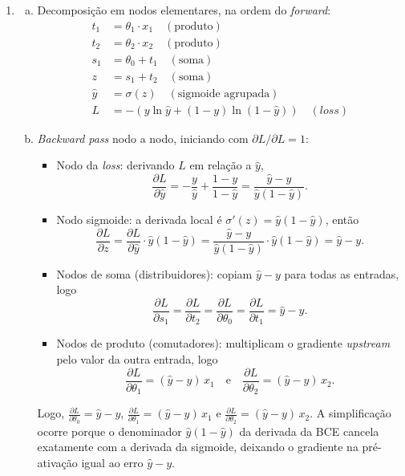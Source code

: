 \documentclass{dlproblemset}
\begin{document}
\begin{enumerate}[1)]
    \item
    \begin{enumerate}[a)]
        \item Decomposição em nodos elementares, na ordem do \textit{forward}:
        \begin{align*}
            t_1 &= \theta_1 \cdot x_1 \quad (\text{produto})\\
            t_2 &= \theta_2 \cdot x_2 \quad (\text{produto})\\
            s_1 &= \theta_0 + t_1 \quad (\text{soma})\\
            z &= s_1 + t_2 \quad (\text{soma})\\
            \hat{y} &= \sigma(z) \quad (\text{sigmoide agrupada})\\
            L &= -\left(y\ln\hat{y} + (1-y)\ln(1-\hat{y})\right) \quad (\textit{loss})
        \end{align*}
        \item \textit{Backward pass} nodo a nodo, iniciando com $\partial L/\partial L = 1$:
        \begin{itemize}
            \item Nodo da \textit{loss}: derivando $L$ em relação a $\hat{y}$,
            $$\frac{\partial L}{\partial \hat{y}} = -\frac{y}{\hat{y}} + \frac{1-y}{1-\hat{y}} = \frac{\hat{y} - y}{\hat{y}(1-\hat{y})}.$$
            \item Nodo sigmoide: a derivada local é $\sigma'(z) = \hat{y}(1-\hat{y})$, então
            $$\frac{\partial L}{\partial z} = \frac{\partial L}{\partial \hat{y}} \cdot \hat{y}(1-\hat{y}) = \frac{\hat{y} - y}{\hat{y}(1-\hat{y})} \cdot \hat{y}(1-\hat{y}) = \hat{y} - y.$$
            \item Nodos de soma (distribuidores): copiam $\hat{y} - y$ para todas as entradas, logo
            $$\frac{\partial L}{\partial s_1} = \frac{\partial L}{\partial t_2} = \frac{\partial L}{\partial \theta_0} = \frac{\partial L}{\partial t_1} = \hat{y} - y.$$
            \item Nodos de produto (comutadores): multiplicam o gradiente \textit{upstream} pelo valor da outra entrada, logo
            $$\frac{\partial L}{\partial \theta_1} = (\hat{y} - y)\,x_1 \quad \text{e} \quad \frac{\partial L}{\partial \theta_2} = (\hat{y} - y)\,x_2.$$
        \end{itemize}
        Logo, $\frac{\partial L}{\partial \theta_0} = \hat{y} - y$, $\frac{\partial L}{\partial \theta_1} = (\hat{y} - y)\,x_1$ e $\frac{\partial L}{\partial \theta_2} = (\hat{y} - y)\,x_2$. A simplificação ocorre porque o denominador $\hat{y}(1-\hat{y})$ da derivada da BCE cancela exatamente com a derivada da sigmoide, deixando o gradiente na pré-ativação igual ao erro $\hat{y} - y$.
    \end{enumerate}


\end{enumerate}
\end{document}
